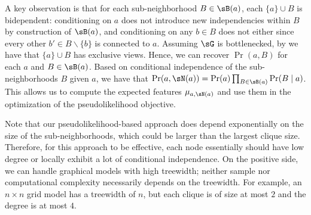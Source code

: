 A key observation is that for each sub-neighborhood $B \in \sB(a)$, each $\{a\} \cup B$ is bidependent:
conditioning on $a$ does not introduce new independencies within $B$ by construction of $\sB(a)$,
and conditioning on any $b \in B$ does not either since every other $b' \in B \backslash \{b\}$
is connected to $a$.
Assuming $\sG$ is bottlenecked, by 
we have that $\{a\} \cup B$ has exclusive views.
Hence, we can recover $\Pr(a,B)$ for each $a$ and $B \in \sB(a)$.
Based on conditional independence of the sub-neighborhoods $B$ given $a$,
we have that $\Pr(a, \sN(a)) = \Pr(a) \prod_{B \in \sB(a)} \Pr(B \mid a)$.
This allows us to compute the expected features $\mu_{a,\sN(a)}$ and use them
in the optimization of the pseudolikelihood objective.


Note that our pseudolikelihood-based approach
does depend exponentially on the size of the sub-neighborhoods,
which could be larger than the largest clique size.
Therefore,
for this approach to be effective,
each node essentially should have low degree or locally exhibit a lot of
conditional independence.
On the positive side, we can handle graphical models with high treewidth;
neither sample nor computational complexity necessarily depends on the treewidth.
For example, an $n\times n$ grid model has a treewidth of $n$, but each
  clique is of size at most $2$ and the degree is at most $4$.
